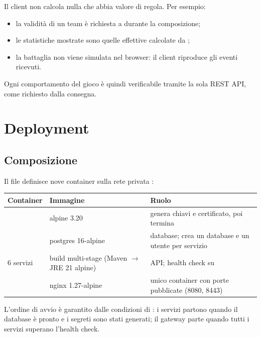 \documentclass[11pt,a4paper]{report}
\begin{document}
Il client non calcola nulla che abbia valore di regola. Per esempio:
\begin{itemize}
  \item la validità di un team è richiesta a  durante la composizione;
  \item le statistiche mostrate sono quelle effettive calcolate da ;
  \item la battaglia non viene simulata nel browser: il client riproduce gli eventi ricevuti.
\end{itemize}
Ogni comportamento del gioco è quindi verificabile tramite la sola REST API, come richiesto dalla consegna.

\chapter{Deployment}

\section{Composizione}

Il file  definisce nove container sulla rete privata :

\begin{center}\small
\begin{tabularx}{\linewidth}{@{}P{2.8cm}P{4.2cm}L@{}}
\toprule
\textbf{Container} & \textbf{Immagine} & \textbf{Ruolo} \\
\midrule
{} & alpine 3.20 & genera chiavi e certificato, poi termina \\
 & postgres 16-alpine & database; crea un database e un utente per servizio \\
6 servizi & build multi-stage (Maven $\rightarrow$ JRE 21 alpine) & API; health check su  \\
 & nginx 1.27-alpine & unico container con porte pubblicate (8080, 8443) \\
\bottomrule
\end{tabularx}
\end{center}

L'ordine di avvio è garantito dalle condizioni di : i servizi partono quando il database è pronto e i segreti sono stati generati; il gateway parte quando tutti i servizi superano l'health check.
\end{document}
